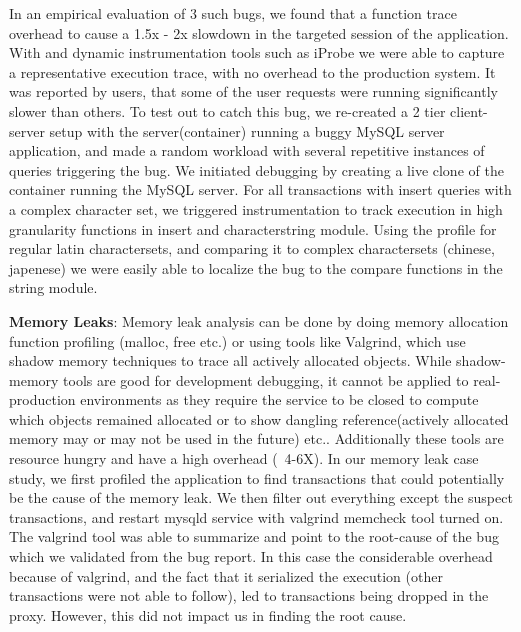 In an empirical evaluation of 3 such bugs, we found that a function trace overhead to cause a 1.5x - 2x slowdown in the targeted session of the application. 
With \parikshan and dynamic instrumentation tools such as iProbe\cite{iProbe} we were able to capture a representative execution trace, with no overhead to the production system.
It was reported by users, that some of the user requests were running significantly slower than others.
To test out \parikshan to catch this bug, we re-created a 2 tier client-server setup with the server(container) running a buggy MySQL server application, and made a random workload with several repetitive instances of queries triggering the bug.
We initiated debugging by creating a live clone of the container running the MySQL server.
For all transactions with insert queries with a complex character set, we triggered instrumentation to track execution in high granularity functions in insert and character\/string module.
Using the profile for regular latin charactersets, and comparing it to complex charactersets (chinese, japenese) we were easily able to localize the bug to the compare functions in the string module.


\noindent
\textbf{Memory Leaks}: %
Memory leak analysis can be done by doing memory allocation function profiling (malloc, free etc.) or using tools like Valgrind\cite{valgrind}, which use shadow memory techniques to trace all actively allocated objects.
While shadow-memory tools are good for development debugging, it cannot be applied to real-production environments as they require the service to be closed to compute which objects remained allocated or to show dangling reference(actively allocated memory may or may not be used in the future) etc.. Additionally these tools are resource hungry and have a high overhead (~4-6X).
In our memory leak case study, we first profiled the application to find transactions that could potentially be the cause of the memory leak. 
We then filter out everything except the suspect transactions, and restart mysqld service with valgrind memcheck tool turned on.
The valgrind tool was able to summarize and point to the root-cause of the bug which we validated from the bug report.
In this case the considerable overhead because of valgrind, and the fact that it serialized the execution (other transactions were not able to follow), led to transactions being dropped in the proxy. 
However, this did not impact us in finding the root cause.

